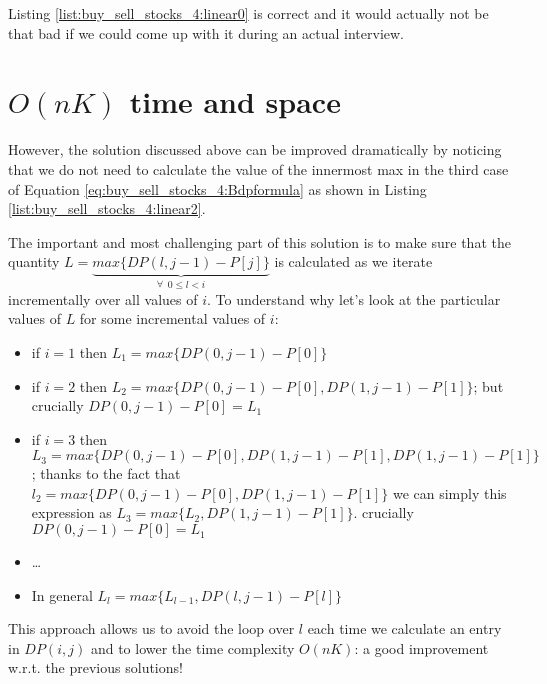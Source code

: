 
Listing \ref{list:buy_sell_stocks_4:linear0} is correct and it would actually not be that bad if we could come up with it during an actual interview. 

\section{$O(nK)$ time and space}
\label{buy_sell_stocks4:sec:linerartime1}
However, the solution discussed above can be improved dramatically by noticing that we do not need to calculate the value of the innermost max in the third case of Equation \ref{eq:buy_sell_stocks_4:Bdpformula} as shown in Listing \ref{list:buy_sell_stocks_4:linear2}.



The important and most challenging part of this solution is to make sure that the quantity $L=\underbrace{max\big\{DP(l,j-1)-P[j]\big\}}_{\forall \: \: 0 \leq l < i}$ is calculated as we iterate incrementally over all values of $i$. 
To understand why let's look at the particular values of $L$ for some incremental values of $i$:
\begin{itemize}
    \item if $i=1$ then $L_1=max\big\{DP(0,j-1)-P[0]\big\}$
    \item if $i=2$ then $L_2=max\big\{DP(0,j-1)-P[0],DP(1,j-1)-P[1]\big\}$; but crucially $DP(0,j-1)-P[0] = L_1$
    \item if $i=3$ then $L_3=max\big\{DP(0,j-1)-P[0],DP(1,j-1)-P[1],DP(1,j-1)-P[1]\big\}$; thanks to the fact that $l_2 = max \{DP(0,j-1)-P[0],DP(1,j-1)-P[1]\}$ we can simply this expression as  $L_3=max\big\{L_2,DP(1,j-1)-P[1]\big\}$.
     crucially $DP(0,j-1)-P[0] = L_1$
     \item \ldots
     \item In general $L_l = max\big\{L_{l-1}, DP(l,j-1)-P[l]\big\}$
\end{itemize}

This approach allows us to avoid the loop over $l$ each time we calculate an entry in $DP(i,j)$ and to lower the time complexity $O(nK)$: a good improvement w.r.t. the previous solutions!


